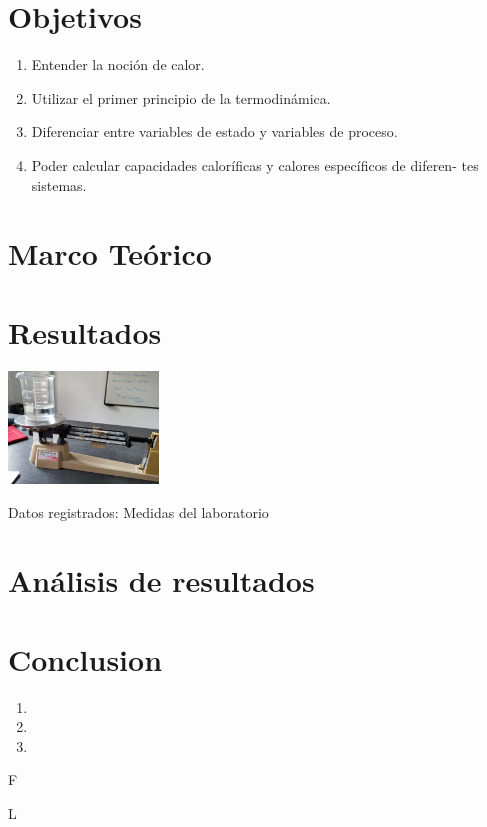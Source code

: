 \documentclass[journal,transmag]{IEEEtran}
\begin{document}
\section{Objetivos}

	\begin{enumerate}
		\item Entender la noción de calor.
		\item Utilizar el primer principio de la termodinámica.
		\item Diferenciar entre variables de estado y variables de proceso.
		\item Poder calcular capacidades caloríficas y calores específicos de diferen-
	tes sistemas. 
	\end{enumerate}
\section{Marco Teórico}

 
 

 
\section{Resultados} 


\vspace{20mm}
\begin{table}[!h] 
	\center 
	\includegraphics[width=4cm]{img/agua.jpeg} 
	\caption{Datos registrados: Medidas del laboratorio} 
	\label{T4} 
\end{table} 



\section{Análisis de resultados}


\section{Conclusion}
	
	\begin{enumerate}[label=(\roman*)]
		\item 
		\item    
		\item  
	\end{enumerate}

\appendices


\ifCLASSOPTIONcaptionsoff
  \newpage
\fi


\begin{thebibliography}{1}


  F 

 L
\end{thebibliography}
\end{document}
